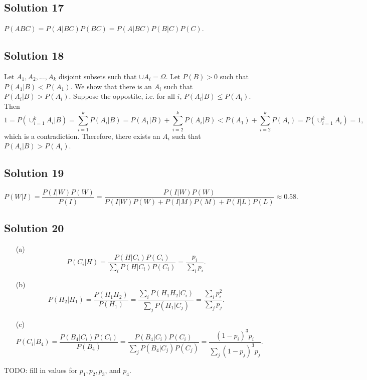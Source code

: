 \subsection*{Solution 17}

$P(ABC) = P(A|BC) P(BC) = P(A|BC) P(B|C) P(C)$.


\subsection*{Solution 18}

Let $A_1, A_2, ..., A_k$ disjoint subsets such that $\cup A_i = \Omega$.
Let $P(B) > 0$ such that $P(A_1|B) < P(A_1)$.
We show that there is an $A_i$ such that $P(A_i|B) > P(A_i)$.
Suppose the oppostite, i.e. for all $i$, $P(A_i|B) \leq P(A_i)$.
Then
\begin{equation*}
    1 = P(\cup_{i = 1}^k A_i|B)
        = \sum_{i = 1}^k P(A_i | B)
        = P(A_1 | B) + \sum_{i = 2}^k P(A_i | B)
        < P(A_1) + \sum_{i = 2}^k P(A_i)
        = P(\cup_{i = 1}^k A_i)
        = 1,
\end{equation*}
which is a contradiction.
Therefore, there exists an $A_i$ such that $P(A_i|B) > P(A_i)$.


\subsection*{Solution 19}

\begin{equation*}
    P(W|I) = \frac{P(I|W)P(W)}{P(I)}
        = \frac{P(I|W)P(W)}{P(I|W)P(W) + P(I|M)P(M) + P(I|L)P(L)}
        \approx 0.58.
\end{equation*}


\subsection*{Solution 20}

\begin{itemize}
    \item[(a)] \begin{equation*}
            P(C_i | H) = \frac{P(H|C_i)P(C_i)}{\sum_i P(H|C_i)P(C_i)}
                = \frac{p_i}{\sum_i p_i}.
        \end{equation*}
    \item[(b)] \begin{equation*}
            P(H_2 | H_1)
                = \frac{P(H_1 H_2)}{P(H_1)}
                = \frac{\sum_i P(H_1 H_2 | C_i)}{\sum_j P(H_1 | C_j)}
                = \frac{\sum_i p_i^2}{\sum_j p_j}.
        \end{equation*}
    \item[(c)] \begin{equation*}
            P(C_i | B_4)
                = \frac{P(B_4 | C_i)P(C_i)}{P(B_4)}
                = \frac{P(B_4 | C_i)P(C_i)}{\sum_j P(B_4 | C_j) P(C_j)}
                = \frac{(1 - p_i)^3 p_i}{\sum_j (1 - p_j)^3 p_j}.
        \end{equation*}
\end{itemize}
TODO: fill in values for $p_1, p_2, p_3$, and $p_4$.


